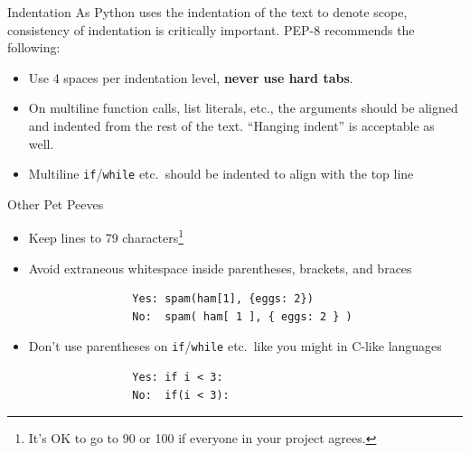 \documentclass{lug}
\begin{document}
\begin{frame}{Indentation}
    As Python uses the indentation of the text to denote scope, consistency of
    indentation is critically important. PEP-8 recommends the following:
    \begin{itemize}[<+->]
        \item Use 4 spaces per indentation level, \textbf{never use hard tabs}.
        \item On multiline function calls, list literals, etc., the arguments
            should be aligned and indented from the rest of the text. ``Hanging
            indent'' is acceptable as well.
        \item Multiline \texttt{if}/\texttt{while} etc.\ should be indented to
            align with the top line
    \end{itemize}
\end{frame}

\begin{frame}[fragile]{Other Pet Peeves}
    \begin{itemize}[<+->]
        \setlength\itemsep{5mm}
        \item Keep lines to 79 characters\footnote{It's OK to go to 90 or 100
            if everyone in your project agrees.}
        \item Avoid extraneous whitespace inside parentheses, brackets, and
            braces

            \medskip

            \begin{minipage}{\linewidth}
            \begin{verbatim}
                Yes: spam(ham[1], {eggs: 2})
                No:  spam( ham[ 1 ], { eggs: 2 } )
            \end{verbatim}
            \end{minipage}

        \item Don't use parentheses on \texttt{if}/\texttt{while} etc.\ like
            you might in C-like languages

            \medskip

            \begin{minipage}{\linewidth}
            \begin{verbatim}
                Yes: if i < 3:
                No:  if(i < 3):
            \end{verbatim}
            \end{minipage}

    \end{itemize}
\end{frame}
\end{document}
